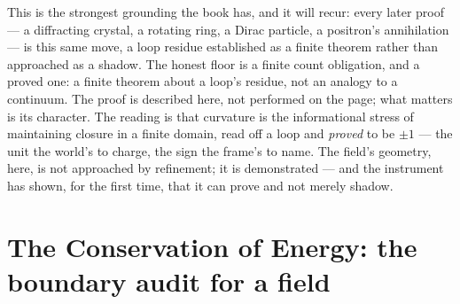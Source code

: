 This is the strongest grounding the book has, and it will recur: every later proof --- a diffracting crystal,
a rotating ring, a Dirac particle, a positron's annihilation --- is this same move, a loop residue established
as a finite theorem rather than approached as a shadow. The honest floor is a finite count obligation, and a
proved one: a finite theorem about a loop's residue, not an analogy to a continuum. The proof is described
here, not performed on the page; what matters is its character. The reading is that curvature is the
informational stress of maintaining closure in a finite domain, read off a loop and \emph{proved} to be
$\pm 1$ --- the unit the world's to charge, the sign the frame's to name. The field's geometry, here, is not
approached by refinement; it is demonstrated --- and the instrument has shown, for the first time, that it can
prove and not merely shadow.

\section{The Conservation of Energy: the boundary audit for a field}
\label{se:conservation-of-energy}

